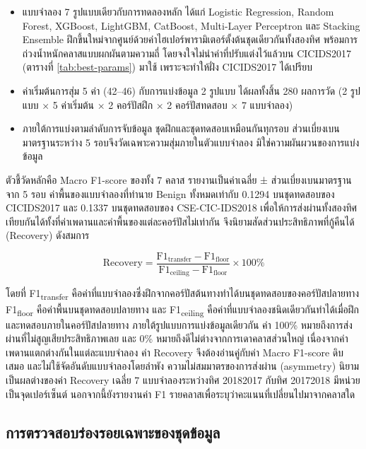 \begin{itemize}
    \item แบบจำลอง 7 รูปแบบเดียวกับการทดลองหลัก ได้แก่ Logistic Regression, Random Forest, XGBoost, LightGBM, CatBoost, Multi-Layer Perceptron และ Stacking Ensemble ฝึกขึ้นใหม่จากศูนย์ด้วยค่าไฮเปอร์พารามิเตอร์ตั้งต้นชุดเดียวกันทั้งสองทิศ พร้อมการถ่วงน้ำหนักคลาสแบบผกผันตามความถี่ โดยจงใจไม่นำค่าที่ปรับแต่งไว้แล้วบน CICIDS2017 (ตารางที่ \ref{tab:best-params}) มาใช้ เพราะจะทำให้ฝั่ง CICIDS2017 ได้เปรียบ
    \item ค่าเริ่มต้นการสุ่ม 5 ค่า (42--46) กับการแบ่งข้อมูล 2 รูปแบบ ได้ผลทั้งสิ้น 280 ผลการวัด (2 รูปแบบ × 5 ค่าเริ่มต้น × 2 คอร์ปัสฝึก × 2 คอร์ปัสทดสอบ × 7 แบบจำลอง)
    \item ภายใต้การแบ่งตามลำดับการจับข้อมูล ชุดฝึกและชุดทดสอบเหมือนกันทุกรอบ ส่วนเบี่ยงเบนมาตรฐานระหว่าง 5 รอบจึงวัดเฉพาะความสุ่มภายในตัวแบบจำลอง มิใช่ความผันผวนของการแบ่งข้อมูล
\end{itemize}

ตัวชี้วัดหลักคือ Macro F1-score ของทั้ง 7 คลาส รายงานเป็นค่าเฉลี่ย ± ส่วนเบี่ยงเบนมาตรฐานจาก 5 รอบ ค่าพื้นของแบบจำลองที่ทำนาย Benign ทั้งหมดเท่ากับ 0.1294 บนชุดทดสอบของ CICIDS2017 และ 0.1337 บนชุดทดสอบของ CSE-CIC-IDS2018 เพื่อให้การส่งผ่านทั้งสองทิศเทียบกันได้ทั้งที่ค่าเพดานและค่าพื้นของแต่ละคอร์ปัสไม่เท่ากัน จึงนิยามสัดส่วนประสิทธิภาพที่กู้คืนได้ (Recovery) ดังสมการ

\begin{equation}
    \mathrm{Recovery} = \frac{\mathrm{F1_{transfer}} - \mathrm{F1_{floor}}}{\mathrm{F1_{ceiling}} - \mathrm{F1_{floor}}} \times 100\%
\end{equation}

โดยที่ F1\textsubscript{transfer} คือค่าที่แบบจำลองซึ่งฝึกจากคอร์ปัสต้นทางทำได้บนชุดทดสอบของคอร์ปัสปลายทาง F1\textsubscript{floor} คือค่าพื้นบนชุดทดสอบปลายทาง และ F1\textsubscript{ceiling} คือค่าที่แบบจำลองชนิดเดียวกันทำได้เมื่อฝึกและทดสอบภายในคอร์ปัสปลายทาง ภายใต้รูปแบบการแบ่งข้อมูลเดียวกัน ค่า 100\% หมายถึงการส่งผ่านที่ไม่สูญเสียประสิทธิภาพเลย และ 0\% หมายถึงดีไม่ต่างจากการเดาคลาสส่วนใหญ่ เนื่องจากค่าเพดานแตกต่างกันในแต่ละแบบจำลอง ค่า Recovery จึงต้องอ่านคู่กับค่า Macro F1-score ดิบเสมอ และไม่ใช้จัดอันดับแบบจำลองโดยลำพัง ความไม่สมมาตรของการส่งผ่าน (asymmetry) นิยามเป็นผลต่างของค่า Recovery เฉลี่ย 7 แบบจำลองระหว่างทิศ 2018\dirarrow{}2017 กับทิศ 2017\dirarrow{}2018 มีหน่วยเป็นจุดเปอร์เซ็นต์ นอกจากนี้ยังรายงานค่า F1 รายคลาสเพื่อระบุว่าคะแนนที่เปลี่ยนไปมาจากคลาสใด

\subsection{การตรวจสอบร่องรอยเฉพาะของชุดข้อมูล}
\label{sec:cd-av-method}

